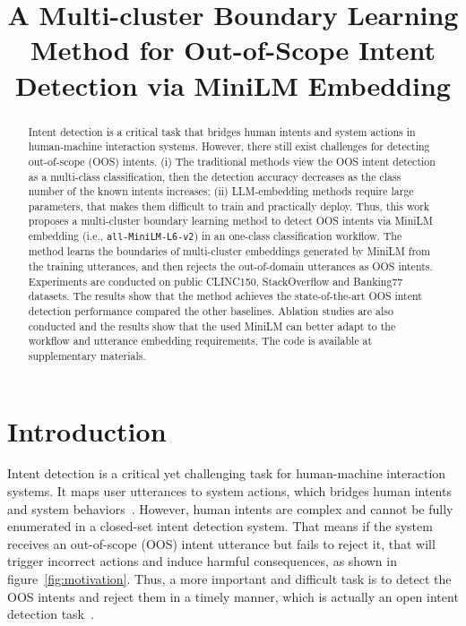 \documentclass[11pt]{article}
\title{A Multi-cluster Boundary Learning Method for Out-of-Scope Intent Detection via MiniLM Embedding}
\begin{document}
\maketitle

\begin{abstract}
Intent detection is a critical task that bridges human intents and system actions in human-machine interaction systems. However, there still exist challenges for detecting out-of-scope (OOS) intents. (i) The traditional methods view the OOS intent detection as a multi-class classification, then the detection accuracy decreases as the class number of the known intents increases; (ii) LLM-embedding methods require large parameters, that makes them difficult to train and practically deploy. Thus, this work proposes a multi-cluster boundary learning method to detect OOS intents via MiniLM embedding (i.e., \texttt{all-MiniLM-L6-v2}) in an one-class classification workflow. The method learns the boundaries of multi-cluster embeddings generated by MiniLM from the training utterances, and then rejects the out-of-domain utterances as OOS intents. Experiments are conducted on public CLINC150, StackOverflow and Banking77 datasets. The results show that the method achieves the state-of-the-art OOS intent detection performance compared the other baselines. Ablation studies are also conducted and the results show that the used MiniLM can better adapt to the workflow and utterance embedding requirements. The code is available at supplementary materials.
\end{abstract}

\section{Introduction}
Intent detection is a critical yet challenging task for human-machine interaction systems. It maps user utterances to system actions, which bridges human intents and system behaviors~\citep{tur2010what,louvan2020recent,wolflein2025agents}. However, human intents are complex and cannot be fully enumerated in a closed-set intent detection system. That means if the system receives an out-of-scope (OOS) intent utterance but fails to reject it, that will trigger incorrect actions and induce harmful consequences, as shown in figure~\ref{fig:motivation}. Thus, a more important and difficult task is to detect the OOS intents and reject them in a timely manner, which is actually an open intent detection task~\citep{hoffman2024inferring, muzahid2024survey}.
\end{document}
